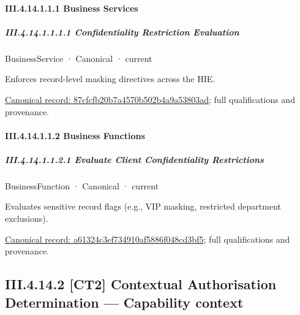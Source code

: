 \paragraph*{III.4.14.1.1.1 Business Services}
\label{navigation:III.4.14.1.1.1}

\subparagraph*{III.4.14.1.1.1.1 Confidentiality Restriction Evaluation}
\label{navigation:III.4.14.1.1.1.1}

\label{element:87cfcfb20b7a4570b502b4a9a53803ad}
{\small BusinessService · Canonical · current}\par

Enforces record-level masking directives across the HIE.


{\footnotesize \href{../../../../continuum/business/business-service/87cfcfb20b7a4570b502b4a9a53803ad.md}{Canonical record: 87cfcfb20b7a4570b502b4a9a53803ad}; full qualifications and provenance.}\par
\paragraph*{III.4.14.1.1.2 Business Functions}
\label{navigation:III.4.14.1.1.2}

\subparagraph*{III.4.14.1.1.2.1 Evaluate Client Confidentiality Restrictions}
\label{navigation:III.4.14.1.1.2.1}

\label{element:a61324c3ef734910af5886f048cd3bf5}
{\small BusinessFunction · Canonical · current}\par

Evaluates sensitive record flags (e.g., VIP masking, restricted department exclusions).


{\footnotesize \href{../../../../continuum/business/business-function/a61324c3ef734910af5886f048cd3bf5.md}{Canonical record: a61324c3ef734910af5886f048cd3bf5}; full qualifications and provenance.}\par
\subsection*{III.4.14.2 [CT2] Contextual Authorisation Determination — Capability context}
\label{navigation:III.4.14.2}

